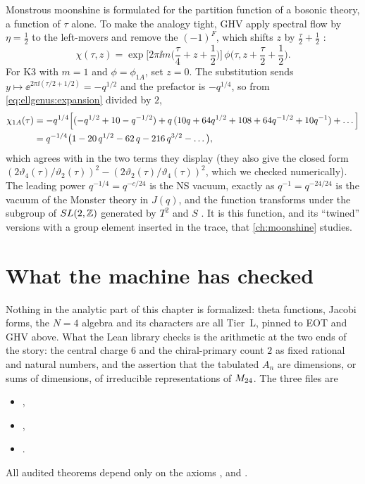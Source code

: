 Monstrous moonshine is formulated for the partition function of a bosonic theory, a
function of $\tau$ alone. To make the analogy tight, GHV apply spectral flow by
$\eta=\tfrac12$ to the left-movers and remove the $(-1)^F$, which shifts $z$ by
$\tfrac\tau2+\tfrac12$ :
\begin{equation}\label{eq:ellgenus:nsdef}
 \chi(\tau,z)=\exp\!\Big[2\pi\ii m\Big(\frac\tau4+z+\frac12\Big)\Big]\,
 \phi\Big(\tau,z+\frac\tau2+\frac12\Big).
\end{equation}
For K3 with $m=1$ and $\phi=\phi_{1A}$, set $z=0$. The substitution sends
$y\mapsto\ee^{2\pi\ii(\tau/2+1/2)}=-q^{1/2}$ and the prefactor is $-q^{1/4}$, so from
\eqref{eq:ellgenus:expansion} divided by $2$,
\begin{align}
 \chi_{1A}(\tau)&=-q^{1/4}\Big[(-q^{1/2}+10-q^{-1/2})+q\,(10q+64q^{1/2}+108+64q^{-1/2}+10q^{-1})
   +\dots\Big]\notag\\
 &=q^{-1/4}\big(1-20\,q^{1/2}-62\,q-216\,q^{3/2}-\dots\big),\label{eq:ellgenus:ns}
\end{align}
which agrees with  in the two terms they display
(they also give the closed form $(2\vartheta_4(\tau)/\vartheta_2(\tau))^2-(2\vartheta_2(\tau)/
\vartheta_4(\tau))^2$, which we checked numerically). The leading power $q^{-1/4}=q^{-c/24}$
is the NS vacuum, exactly as $q^{-1}=q^{-24/24}$ is the vacuum of the Monster theory in
$J(q)$, and the function transforms under the subgroup of $SL(2,\mathbb{Z})$ generated by $T^2$ and $S$
. It is this function, and its ``twined''
versions with a group element inserted in the trace, that \cref{ch:moonshine} studies.

\section{What the machine has checked}\label{sec:ellgenus:lean}

Nothing in the analytic part of this chapter is formalized: theta functions, Jacobi forms,
the $N=4$ algebra and its characters are all Tier~L, pinned to EOT and GHV above. What the
Lean library checks is the arithmetic at the two ends of the story: the central charge $6$
and the chiral-primary count $2$ as fixed rational and natural numbers, and the assertion
that the tabulated $A_n$ are dimensions, or sums of dimensions, of irreducible
representations of $M_{24}$. The three files are
\begin{itemize}[leftmargin=1.5em,itemsep=0pt]
\item {},
\item {},
\item {}.
\end{itemize}
All audited theorems depend only on the axioms ,  and
.

